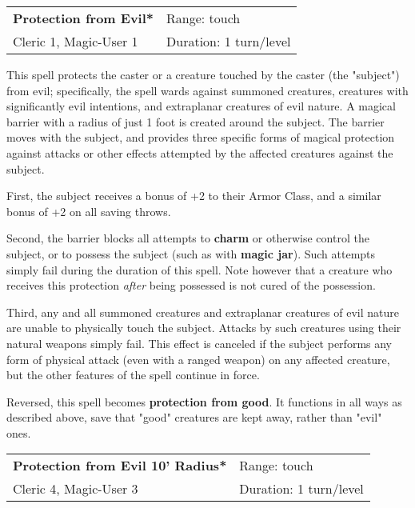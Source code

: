 \documentclass[a4paper,twoside,openany,10pt]{book}
\begin{document}
\begin{multicols}{2}
\smallskip\begin{flushleft} 
	\begin{tabularx}{0.45\textwidth}{@{}m{3.5cm}m{5.5cm}@{}} 
		\textbf{Protection from Evil*} & Range: touch\\
Cleric 1, Magic-User 1 & Duration: 1 turn/level\\
	\end{tabularx}\end{flushleft}

This spell protects the caster or a creature touched by the caster (the "subject") from evil; specifically, the spell wards against summoned creatures, creatures with significantly evil intentions, and extraplanar creatures of evil nature. A magical barrier with a radius of just 1 foot is created around the subject. The barrier moves with the subject, and provides three specific forms of magical protection against attacks or other effects attempted by the affected creatures against the subject. 

First, the subject receives a bonus of +2 to their Armor Class, and a similar bonus of +2 on all saving throws.

Second, the barrier blocks all attempts to \textbf{charm }or otherwise control the subject, or to possess the subject (such as with \textbf{magic jar}). Such attempts simply fail during the duration of this spell. Note however that a creature who receives this protection \emph{after} being possessed is not cured of the possession.

Third, any and all summoned creatures and extraplanar creatures of evil nature are unable to physically touch the subject. Attacks by such creatures using their natural weapons simply fail. This effect is canceled if the subject performs any form of physical attack (even with a ranged weapon) on any affected creature, but the other features of the spell continue in force.

Reversed, this spell becomes \textbf{protection from good}. It functions in all ways as described above, save that "good" creatures are kept away, rather than "evil" ones.


\smallskip\begin{flushleft} 
	\begin{tabularx}{0.45\textwidth}{@{}m{4.7cm}m{5.5cm}@{}} 
		\textbf{Protection from Evil 10' Radius*} & Range: touch\\
Cleric 4, Magic-User 3 & Duration: 1 turn/level\\
	\end{tabularx}\end{flushleft}


\end{multicols}
\end{document}
